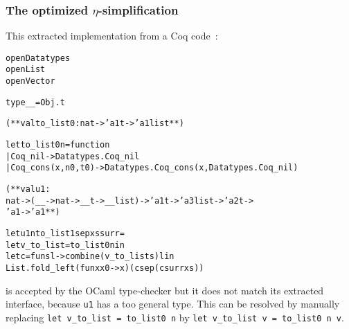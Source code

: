 \documentclass[a4paper, 11pt]{article}
\newenvironment{ml}
  {%
   \begin{alltt}
   \footnotesize} %% 3.12.0
  {\end{alltt} %
  }
\begin{document}
\subsubsection{The optimized $\eta$-simplification}
\label{s:appendix_eta}
This extracted implementation from a Coq code~:
\begin{ml}
open Datatypes
open List
open Vector

type __ = Obj.t

(** val to_list0 : nat -> 'a1 t -> 'a1 list **)

let to_list0 n = function
| Coq_nil -> Datatypes.Coq_nil
| Coq_cons (x, n0, t0) -> Datatypes.Coq_cons (x, Datatypes.Coq_nil)

(** val u1 :
    nat -> (__ -> nat -> __ t -> __ list) -> 'a1 t -> 'a3 list -> 'a2 t ->
    'a1 -> 'a1 **)

let u1 n to_list1 sep xs surr =
  let v_to_list = to_list0 n in
  let c = fun s l -> combine (v_to_list s) l in
  List.fold_left (fun x x0 -> x) (c sep (c surr xs))
\end{ml}
is accepted by the OCaml type-checker but it does not match its extracted interface, because \verb|u1| has a too general type. This can be resolved by manually replacing \verb|let v_to_list = to_list0 n| by \verb|let v_to_list v = to_list0 n v|.
\end{document}
